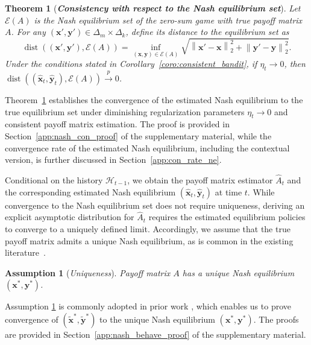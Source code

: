 \documentclass[12pt]{article}
\newtheorem{theorem}{Theorem}
\newtheorem{assumption}{Assumption}[section]
\begin{document}
\begin{theorem}[{\textbf{\emph{Consistency with respect to the Nash equilibrium set}}}]
\label{thm:nash_con}
Let $\mathcal E(A)$ is the Nash equilibrium set of the zero-sum game with true payoff matrix $A$. For any $(\bm x',\bm y')\in\Delta_m\times\Delta_k$, define its distance to the equilibrium set as
\[
\operatorname{dist}
\left(
(\bm x',\bm y'),
\mathcal E(A)
\right)
=
\inf_{(\bm x,\bm y)\in\mathcal E(A)}
\sqrt{
\left\|
\bm x'-\bm x
\right\|_2^2
+
\left\|
\bm y'-\bm y
\right\|_2^2
}.
\]
Under the conditions stated in Corollary~\ref{coro:consistent_bandit}, if $\eta_t\to 0$, then 
$\operatorname{dist}
\left(
(\widehat{\bm x}_t,\widehat{\bm y}_t),
\mathcal E(A)
\right)
\stackrel{p}{\to}
0$.
\end{theorem}


Theorem~\ref{thm:nash_con} establishes the convergence of the estimated Nash equilibrium to the true equilibrium set under diminishing regularization parameters $\eta_t \to 0$ and consistent payoff matrix estimation. The proof is provided in Section~\ref{app:nash_con_proof} of the supplementary material, while the convergence rate of the estimated Nash equilibrium, including the contextual version, is further discussed in Section~\ref{app:con_rate_ne}.

Conditional on the history $\mathcal H_{t-1}$, we obtain the payoff matrix estimator $\widehat A_t$ and the corresponding estimated Nash equilibrium $(\widehat{\bm x}_t,\widehat{\bm y}_t)$ at time $t$. 
While convergence to the Nash equilibrium set does not require uniqueness, deriving an explicit asymptotic distribution for $\widehat A_t$ requires the estimated equilibrium policies to converge to a uniquely defined limit. Accordingly, we assume that the true payoff matrix admits a unique Nash equilibrium, as is common in the existing literature~\citep{bailey2018multiplicative,daskalakis2018last,wei2020linear,maiti2025limitations}.

\begin{assumption}[{\emph{Uniqueness}}]
\label{ass:unique}
    Payoff matrix $A$ has a unique Nash equilibrium $(\bm{x}^\ast,\bm{y}^\ast)$.
\end{assumption}
Assumption \ref{ass:unique} is commonly adopted in prior work \citep{bailey2018multiplicative,daskalakis2018last,wei2020linear,maiti2025limitations}, which enables us to prove convergence of $(\widetilde{\bm{x}}^\ast,\widetilde{\bm{y}}^\ast)$ to the unique Nash equilibrium $(\bm{x}^\ast,\bm{y}^\ast)$. 
The proofs are provided in Section~\ref{app:nash_behave_proof} of the supplementary material.
\end{document}
